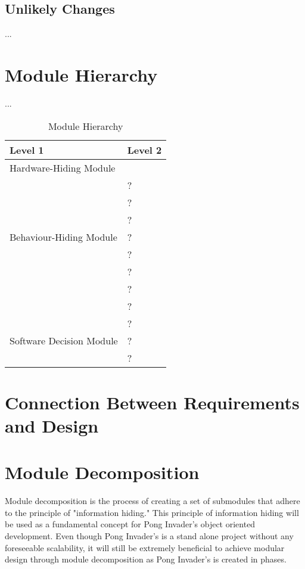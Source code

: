\documentclass[12pt, titlepage]{article}
\newcounter{ucnum}
\newcommand{\uctheucnum}{UC\theucnum}
\newcounter{mnum}
\newcommand{\mthemnum}{M\themnum}
\begin{document}
\subsection{Unlikely Changes} \label{SecUchange}

\begin{description}
\item[ \uctheucnum \label{ucIO}:] 
\item[ \uctheucnum \label{ucInput}:] 
\item ...
\end{description}
\section{Module Hierarchy} \label{SecMH}

\begin{description}
\item [ \mthemnum \label{mHH}:]
\item ...
\end{description}
\begin{table}[h!]
\centering
\begin{tabular}{p{} p{}}
\toprule
\textbf{Level 1} & \textbf{Level 2}\\
\midrule
{Hardware-Hiding Module} & ~ \\
\midrule
\multirow{7}{0.3\textwidth}{Behaviour-Hiding Module} & ?\\
& ?\\
& ?\\
& ?\\
& ?\\
& ?\\
& ?\\ 
& ?\\
\midrule
\multirow{3}{0.3\textwidth}{Software Decision Module} & {?}\\
& ?\\
& ?\\
\bottomrule
\end{tabular}
\caption{Module Hierarchy}
\label{TblMH}
\end{table}
\section{Connection Between Requirements and Design} \label{SecConnection}

\section{Module Decomposition} \label{SecMD}
Module decomposition is the process of creating a set of submodules that adhere to the principle of  "information hiding." This principle of information hiding will be used as a fundamental concept for Pong Invader's object oriented development. Even though Pong Invader's is a stand alone project without any foreseeable scalability, it will still be extremely beneficial to achieve modular design through module decomposition as Pong Invader's is created in phases.
\end{document}
